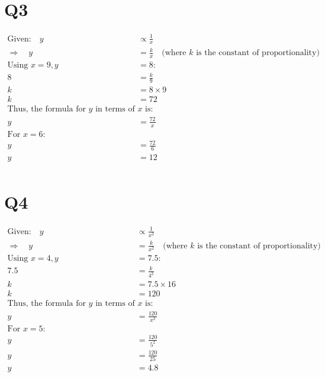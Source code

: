 \documentclass{article}
\begin{document}
\section*{Q3}
\begin{align*}
    \text{Given:} \quad y & \propto \frac{1}{x} \\
    \Rightarrow \quad y & = \frac{k}{x} \quad \text{(where } k \text{ is the constant of proportionality)} \\
    \text{Using } x = 9, y & = 8: \\
    8 & = \frac{k}{9} \\
    k & = 8 \times 9 \\
    k & = 72 \\
    \text{Thus, the formula for } y \text{ in terms of } x \text{ is:} \\
    y & = \frac{72}{x} \\
    \text{For } x = 6: \\
    y & = \frac{72}{6} \\
    y & = 12 \\
    \end{align*}
\section*{Q4}
\begin{align*}
    \text{Given:} \quad y & \propto \frac{1}{x^2} \\
    \Rightarrow \quad y & = \frac{k}{x^2} \quad \text{(where } k \text{ is the constant of proportionality)} \\
    \text{Using } x = 4, y & = 7.5: \\
    7.5 & = \frac{k}{4^2} \\
    k & = 7.5 \times 16 \\
    k & = 120 \\
    \text{Thus, the formula for } y \text{ in terms of } x \text{ is:} \\
    y & = \frac{120}{x^2} \\
    \text{For } x = 5: \\
    y & = \frac{120}{5^2} \\
    y & = \frac{120}{25} \\
    y & = 4.8 \\
    \end{align*}
\end{document}
